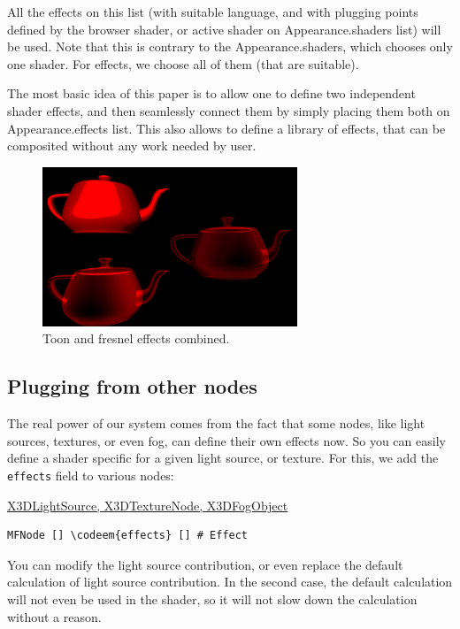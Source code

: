 \documentclass{acmsiggraph}                     %
\newenvironment{mycode}
{\begin{mycodecore}}
{\end{mycodecore}
\vspace{-0.1in}}
\newcommand*{\codeem}[1]{\textbf{#1}}
\begin{document}
All the effects on this list (with suitable language, and with
plugging points defined by the browser shader, or active shader on
Appearance.shaders list) will be used. Note that this is contrary to
the Appearance.shaders, which chooses only one shader. For effects, we
choose all of them (that are suitable).

The most basic idea of this paper is to allow one to define two
independent shader effects, and then seamlessly connect them by simply
placing them both on Appearance.effects list. This also allows to
define a library of effects, that can be composited without any work
needed by user.

\begin{figure}[H]
  \centering
  \includegraphics[width=3in]{fresnel_and_toon}
  \caption{Toon and fresnel effects combined.}
\end{figure}

\subsection{Plugging from other nodes}

The real power of our system comes from the fact that some nodes,
like light sources, textures, or even fog, can define their own effects
now. So you can easily define a shader specific for a given light source,
or texture. For this, we add the \texttt{effects} field to various nodes:

\begin{mycode}
\underline{X3DLightSource, X3DTextureNode, X3DFogObject}
\begin{Verbatim}[commandchars=\\\{\}]
MFNode [] \codeem{effects} [] # Effect
\end{Verbatim}
\end{mycode}


You can modify the light source contribution, or even replace the default
calculation of light source contribution. In the second case,
the default calculation will not even be used in the shader,
so it will not slow down the calculation without a reason.
\end{document}
